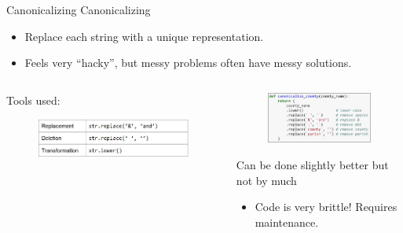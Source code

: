 \documentclass[aspectratio=169]{../latex_main/tntbeamer}  %
\begin{document}
	
	\begin{frame}{Canonicalizing}
	    Canonicalizing
	    \begin{itemize}
	        \item Replace each string with a unique representation.
	        \item Feels very “hacky”, but messy problems often have messy solutions.
	    \end{itemize}
	    \begin{columns}
	    
	     \begin{column}{.6\textwidth}
	     
	    Tools used:
	    \begin{figure}
	          \includegraphics[scale=.36]{Bild4}
	    \end{figure}

	    
	     \end{column}
	     
	     
	     \begin{column}{.45\textwidth}
	     \begin{figure}
	         \includegraphics[scale=.5]{Bild3}
	     \end{figure}
	     
	      Can be done slightly better but not by much 
	    \begin{itemize}
	        \item Code is very brittle! Requires maintenance.
	    \end{itemize}
	    \end{column}
	    \end{columns}
	    
	\end{frame}
\end{document}
